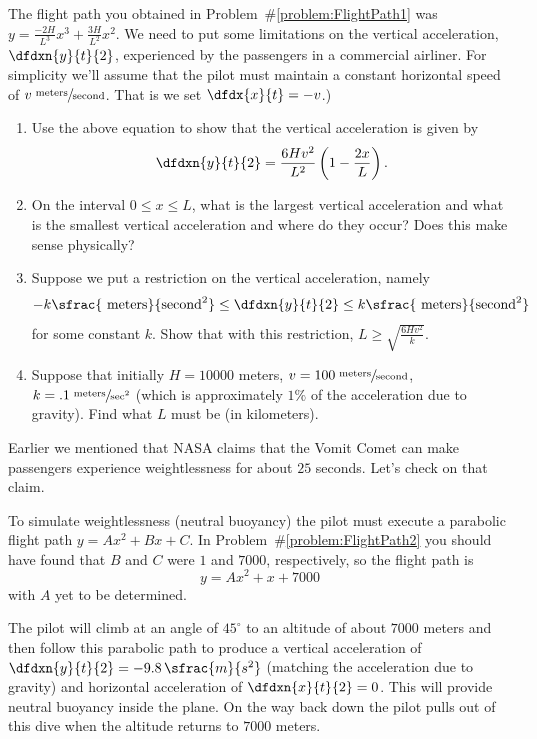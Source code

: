 \begin{embeddedproblem}
  The flight path you obtained in Problem~\#\ref{problem:FlightPath1}
  was $ y=\frac{-2H}{L^3}x^3+\frac{3H}{L^2}x^2 $.
  We need to put some limitations on the vertical acceleration,
  $\dfdxn{y}{t}{2}$, experienced by the passengers in a commercial
  airliner. For simplicity we'll assume that the pilot must maintain a
  constant horizontal speed of $v\sfrac{\text{
      meters}}{\text{second}}$. That is we set  $\dfdx{x}{t}=-v$.)
  \begin{enumerate}[label={\bf{}(\alph*)}]
  \item Use the above equation to show that the vertical acceleration
    is given by
    $$ \dfdxn{y}{t}{2}=\frac{6Hv^2}{L^2}\left(1-\frac{2x}{L}\right).$$
  \item On the interval $0\le x\le L$, what is the largest vertical
    acceleration and what is the smallest vertical acceleration and
    where do they occur?  Does this make sense physically?
  \item Suppose we put a restriction on the vertical acceleration,
    namely
    $$
    -k\sfrac{\text{ meters}}{\text{second}^2}\le\dfdxn{y}{t}{2}\le k\sfrac{\text{ meters}}{\text{second}^2}
    $$
    for some constant $k$.  Show that with this restriction,
    $
    L\ge\sqrt{\frac{6Hv^2}{k}}
    $.
  \item Suppose that initially $H=10000$ meters, $v=100\sfrac{\text{
        meters}}{\text{second}}$,
    $k=.1\sfrac{\text{ meters}}{\text{sec}^2}$ (which is approximately $1\%$ of
    the acceleration due to gravity).  Find what $L$ must be (in
    kilometers).%
  \end{enumerate}
\end{embeddedproblem}

 \pagebreak[4]


Earlier we mentioned that NASA claims that the Vomit Comet can
make passengers experience weightlessness for about $25$ seconds.
Let's check on that claim.


To simulate weightlessness (neutral buoyancy) the pilot must
execute a parabolic flight path $y=Ax^2+Bx+C$. In
Problem~\#\ref{problem:FlightPath2} you should have found that $B$
and $C$ were $1$ and $7000$, respectively, so the flight path is
$$
y=Ax^2+x+7000
$$
with $A$ yet to be determined.


The pilot will climb at an angle of $45^\circ$ to an altitude of about
$7000$ meters and then follow this parabolic path to produce a
vertical acceleration of $\dfdxn{y}{t}{2}=-9.8\,\sfrac{m}{s^2}$
(matching the acceleration due to gravity) and horizontal acceleration
of $\dfdxn{x}{t}{2}=0$. This will provide neutral buoyancy inside the
plane.  On the way back down the pilot pulls out of this dive when the
altitude returns to $7000$ meters.

